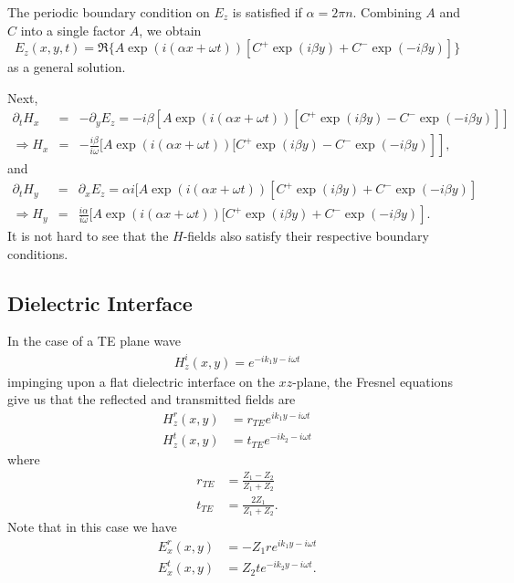 The periodic boundary condition on $E_z$ is satisfied if $\alpha = 2 \pi n$.
Combining $A$ and $C$ into a single factor $A$, we obtain
\[ E_z (x, y, t) = \Re \{ A \exp (i (\alpha x + \omega
   t)) [C^+ \exp (i \beta y) + C^- \exp (- i \beta y)] \} \]
as a general solution.

Next,
\begin{eqnarray*}
  \partial_t H_x & = & - \partial_y E_z = - i \beta [A
  \exp (i (\alpha x + \omega t)) [C^+ \exp (i \beta y) - C^- \exp (- i
  \beta y)]]\\
  \Rightarrow H_x & = & \left. \left. - \frac{i \beta}{i \omega} [A \exp (i
  (\alpha x + \omega t)) [C^+ \exp (i \beta y) - C^- \exp (- i \beta y)
  \right] \right],
\end{eqnarray*}
and
\begin{eqnarray*}
  \partial_t H_y & = & \partial_x E_z = \alpha i [A \exp (i (\alpha
  x + \omega t)) [C^+ \exp (i \beta y) + C^- \exp (- i \beta y)]\\
  \Rightarrow H_y & = & \left. \frac{i \alpha}{i \omega} [A \exp (i (\alpha x
  + \omega t)) [C^+ \exp (i \beta y) + C^- \exp (- i \beta y) \right] .
\end{eqnarray*}
It is not hard to see that the $H$-fields also satisfy their respective
boundary conditions.

\subsection{Dielectric Interface}

In the case of a TE plane wave
\begin{align*}
  H_z^i(x, y) = e^{-ik_1y - i\omega t}
\end{align*}
impinging upon a flat dielectric interface on the $xz$-plane, the
Fresnel equations give us that the reflected and transmitted fields
are
\begin{align*}
  H_z^r(x, y) &= r_{TE} e^{ik_1y - i\omega t} \\
  H_z^t(x, y) &= t_{TE} e^{-ik_2 - i\omega t}
\end{align*}
where
\begin{align*}
  r_{TE} &= \frac{Z_1 - Z_2}{Z_1 + Z_2} \\
  t_{TE} &= \frac{2Z_1}{Z_1 + Z_2}.
\end{align*}
Note that in this case we have
\begin{align*}
  E_x^r(x, y) &= -Z_1re^{ik_1y - i\omega t} \\
  E_x^t(x, y) &= Z_2te^{-ik_2y - i\omega t}.
\end{align*}

